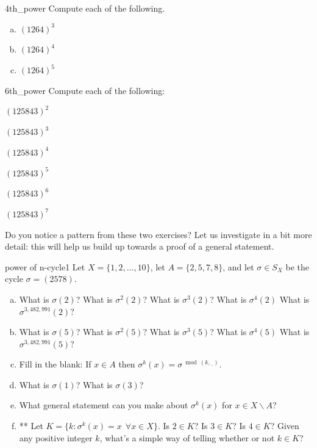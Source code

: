 \begin{exercise}{4th_power}
Compute each of the following.
\begin{multicols}{3}
\begin{enumerate}[(a)]
\item
$(1 2 6 4)^3$
\item
$(1 2 6 4)^4$
\item
$(1 2 6 4)^5$
\end{enumerate}
\end{multicols}
\end{exercise}

\begin{exercise}{6th_power}
Compute each of the following:
\begin{enumerate}[(a)]
\begin{multicols}{3}
\item
$(1 2 5 8 4 3)^2$
\item
$(1 2 5 8 4 3)^3$
\item
$(1 2 5 8 4 3)^4$
\item
$(1 2 5 8 4 3)^5$
\item
$(1 2 5 8 4 3)^6$
\item
$(1 2 5 8 4 3)^7$
\end{multicols}
\end{enumerate}
\end{exercise}

\noindent
Do you notice a pattern from these two exercises?  Let us investigate in a bit more detail: this will help us build up towards a proof of a general statement.

\begin{exercise}{power of n-cycle1}
Let $X = \{1,2,\ldots,10\}$, let $A = \{2,5,7,8\}$, and let $\sigma \in S_X$ be the cycle  $\sigma = ( 2 5 7 8 )$. \begin{enumerate}[(a)]
\item
What is $\sigma(2)$? What is $\sigma^2(2)$? What is $\sigma^3(2)$? What is $\sigma^4(2)$ What is $\sigma^{3,482,991}(2)?$  
\item
What is $\sigma(5)$? What is $\sigma^2(5)$? What is $\sigma^3(5)$? What is $\sigma^4(5)$ What is $\sigma^{3,482,991}(5)?$  
\item
Fill in the blank: If $x \in A$ then $\sigma^k(x) = \sigma^{\bmod(k,\underline{~~})}$.
\item
What is $\sigma(1)$? What is $\sigma(3)$? 
\item
What general statement can you make about $\sigma^k(x)$ for $x \in X \backslash A$?
\item ** Let $K = \{k: \sigma^k(x) = x ~~\forall x \in X\}$. Is $2 \in K$?   Is $3 \in K$? Is $4 \in K$? Given any positive integer $k$, what's a simple way of telling whether or not $k \in K$?
\end{enumerate}
\end{exercise}

